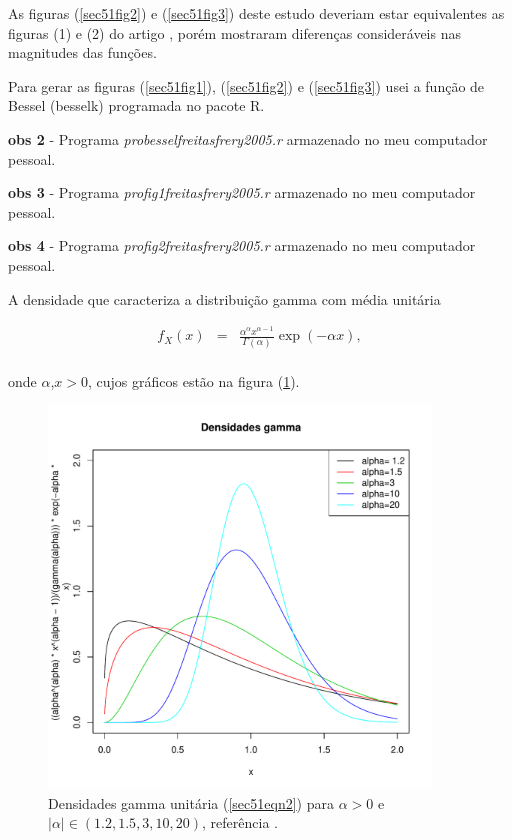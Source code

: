 \documentclass[12pt,a4paper]{article}
\begin{document}
	
As figuras (\ref{sec51fig2}) e (\ref{sec51fig3}) deste estudo deveriam estar equivalentes as figuras (1) e (2) do artigo \cite{freitas_frery_2005}, porém mostraram diferenças consideráveis nas magnitudes das funções. 

Para gerar as figuras (\ref{sec51fig1}), (\ref{sec51fig2}) e (\ref{sec51fig3}) usei a função de Bessel (besselk) programada no pacote R.

{\bf obs 2} - Programa {\it probesselfreitasfrery2005.r} armazenado no meu computador pessoal.

{\bf obs 3} - Programa {\it profig1freitasfrery2005.r} armazenado no meu computador pessoal.

{\bf obs 4} - Programa {\it profig2freitasfrery2005.r} armazenado no meu computador pessoal.

A densidade que caracteriza a distribuição gamma com média unitária

\begin{equation}\label{sec51eqn2}
\begin{array}{ccc}
	f_{X}(x)&=&\frac{\alpha^{\alpha}x^{\alpha-1}}{\Gamma(\alpha)}\exp\left(-\alpha x\right), \\
\end{array}
\end{equation}

onde $\alpha$,$x>0$, cujos gráficos estão na figura (\ref{sec51fig4}).

\begin{figure}[!htb]
\centering
\includegraphics[width=4.0in]{fig3a_freitas_frery_2005.pdf}
	\caption{Densidades  gamma unitária (\ref{sec51eqn2}) para $\alpha > 0$ e $|\alpha|\in(1.2,1.5,3,10,20)$, referência \cite{freitas_frery_2005} .}
\label{sec51fig4}
\end{figure}
\end{document}
